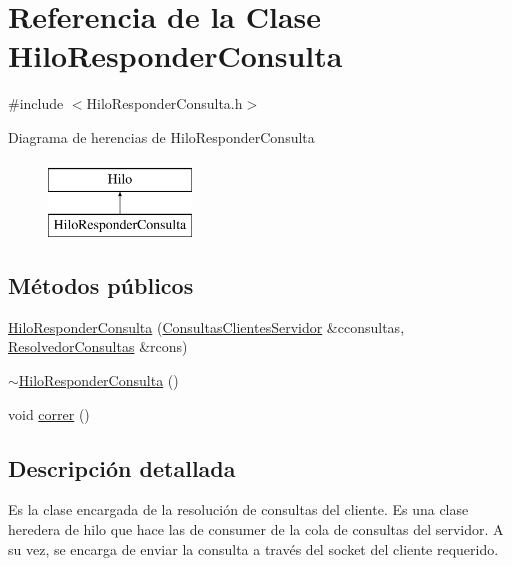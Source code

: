 \hypertarget{classHiloResponderConsulta}{\section{\-Referencia de la \-Clase \-Hilo\-Responder\-Consulta}
\label{classHiloResponderConsulta}
}


{\ttfamily \#include $<$\-Hilo\-Responder\-Consulta.\-h$>$}

\-Diagrama de herencias de \-Hilo\-Responder\-Consulta\begin{figure}[H]
\begin{center}
\leavevmode
\includegraphics[height=2.000000cm]{classHiloResponderConsulta}
\end{center}
\end{figure}
\subsection*{\-Métodos públicos}
\begin{DoxyCompactItemize}
\item 
\hyperlink{classHiloResponderConsulta_aef65ff26b3d1ece048e2a83038e4a891}{\-Hilo\-Responder\-Consulta} (\hyperlink{classBLQueue}{\-Consultas\-Clientes\-Servidor} \&cconsultas, \hyperlink{classResolvedorConsultas}{\-Resolvedor\-Consultas} \&rcons)
\item 
\hyperlink{classHiloResponderConsulta_a460be54bcc8b8e6236a7c292192d56d4}{$\sim$\-Hilo\-Responder\-Consulta} ()
\item 
void \hyperlink{classHiloResponderConsulta_a11e5fc2a5b3ae20696a1051a4c282845}{correr} ()
\end{DoxyCompactItemize}


\subsection{\-Descripción detallada}
\-Es la clase encargada de la resolución de consultas del cliente. \-Es una clase heredera de hilo que hace las de consumer de la cola de consultas del servidor. \-A su vez, se encarga de enviar la consulta a través del socket del cliente requerido. 


